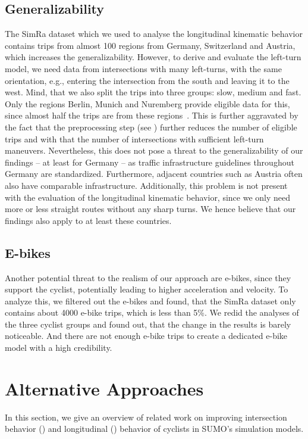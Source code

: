 \subsection{Generalizability}%
\label{subsec:problem_general}
The SimRa dataset which we used to analyse the longitudinal kinematic behavior contains trips from almost \num{100} regions from Germany, Switzerland and Austria, which increases the generalizability.
However, to derive and evaluate the left-turn model, we need data from intersections with many left-turns, with the same orientation, e.g., entering the intersection from the south and leaving it to the west.
Mind, that we also split the trips into three groups: slow, medium and fast.
Only the regions Berlin, Munich and Nuremberg provide eligible data for this, since almost half the trips are from these regions~\cite{karakaya2023cyclesense}.
This is further aggravated by the fact that the preprocessing step (see ) further reduces the number of eligible trips and with that the number of intersections with sufficient left-turn maneuvers.
Nevertheless, this does not pose a threat to the generalizability of our findings -- at least for Germany -- as traffic infrastructure guidelines throughout Germany are standardized.
Furthermore, adjacent countries such as Austria often also have comparable infrastructure.
Additionally, this problem is not present with the evaluation of the longitudinal kinematic behavior, since we only need more or less straight routes without any sharp turns.
We hence believe that our findings also apply to at least these countries.

\subsection{E-bikes}
\label{subsec:e-bikes}
Another potential threat to the realism of our approach are e-bikes, since they support the cyclist, potentially leading to higher acceleration and velocity.
To analyze this, we filtered out the e-bikes and found, that the SimRa dataset only contains about \num{4000} e-bike trips, which is less than \num{5}\%.
We redid the analyses of the three cyclist groups and found out, that the change in the results is barely noticeable.
And there are not enough e-bike trips to create a dedicated e-bike model with a high credibility.


\section{Alternative Approaches}
\label{sec:related_work_sumo}
In this section, we give an overview of related work on improving intersection behavior () and longitudinal () behavior of cyclists in SUMO's simulation models.

